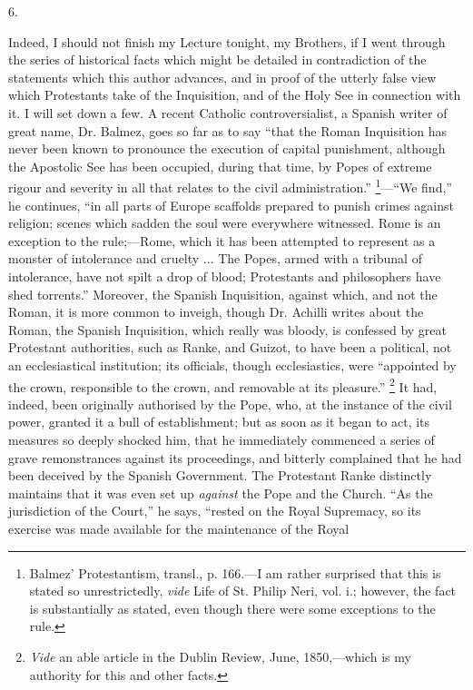 6.

Indeed, I should not finish my Lecture tonight, my
Brothers, if I went through the series of historical
facts which might be detailed in contradiction of the
statements which this author advances, and in proof of
the utterly false view which Protestants take of the
Inquisition, and of the Holy See in connection with it. I
will set down a few. A recent Catholic controversialist,
a Spanish writer of great name, Dr. Balmez, goes so far
as to say ``that the Roman Inquisition has never been
known to pronounce the execution of capital punishment,
although the Apostolic See has been occupied, during that
time, by Popes of extreme rigour and severity in all that
relates to the civil administration.'' \footnote{Balmez' Protestantism,
transl., p. 166.—I am rather surprised that this is
stated so unrestrictedly, \emph{vide} Life of St.
Philip Neri, vol. i.; however, the fact is substantially
as stated, even though there were some exceptions to the
rule.}—``We
find,'' he continues, ``in all parts of Europe
scaffolds prepared to punish crimes against religion;
scenes which sadden the soul were everywhere witnessed.
Rome is an exception to the rule;—Rome, which it has
been attempted to represent as a monster of intolerance
and cruelty ... The Popes, armed with a tribunal of
intolerance, have not spilt a drop of blood; Protestants
and philosophers have shed torrents.'' Moreover, the
Spanish Inquisition, against which, and not the Roman, it
is more common to inveigh, though Dr. Achilli writes
about the Roman, the Spanish Inquisition, which really
was bloody, is confessed by great Protestant authorities,
such as Ranke, and Guizot, to have been a political, not
an ecclesiastical institution; its officials, though
ecclesiastics, were ``appointed by the crown,
responsible to the crown, and removable at its
pleasure.'' \footnote{\emph{Vide} an able article
in the Dublin Review, June, 1850,—which is my
authority for this and other facts.} It had, indeed, been originally authorised by
the Pope, who, at the instance of the civil power,
granted it a bull of establishment; but as soon as it
began to act, its measures so deeply shocked him, that he
immediately commenced a series of grave remonstrances
against its proceedings, and bitterly complained that he
had been deceived by the Spanish Government. The
Protestant Ranke distinctly maintains that it was even
set up \emph{against} the Pope and the Church. ``As
the jurisdiction of the Court,'' he says,
``rested on the Royal Supremacy, so its exercise was
made available for the maintenance of the Royal
